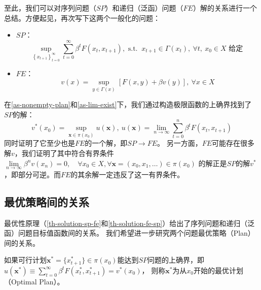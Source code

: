 至此，我们可以对序列问题（$SP$）和递归（泛函）问题（$FE$）解的关系进行一个总结。方便起见，再次写下这两个一般化的问题：
\begin{itemize}
    \item $SP$：
    \begin{equation*}
        \sup _{\left\{x_{t+1}\right\}_{t=0}^{\infty}} \sum_{t=0}^{\infty} \beta^t F\left(x_t, x_{t+1}\right),
            \text { s.t. } ~x_{t+1} \in\Gamma\left(x_t\right), ~\forall t, ~x_0 \in X \text { 给定 }
    \end{equation*}
    \item $FE$：
    \begin{equation*}
        v(x)=\sup _{y \in \Gamma(x)}[F(x, y)+\beta v(y)], ~\forall x \in X
    \end{equation*}
\end{itemize}

在\cref{as-nonempty-plan}和\cref{as-lim-exist}下，我们通过构造极限函数的上确界找到了$SP$的解：
\begin{equation*}
    v^*\left(x_0\right)=\sup _{\boldsymbol{x}\in\pi\left(x_0\right)}u\left(\boldsymbol{x}\right), ~
        u\left(\boldsymbol{x}\right)=\lim_{n\rightarrow\infty}\sum_{t=0}^{n}\beta^t F\left(x_t,x_{t+1}\right)
\end{equation*}
同时证明了它至少也是$FE$的一个解，即$SP\rightarrow FE$。
另一方面，$FE$可能存在很多解$v$，我们证明了其中符合有界条件
$\lim\limits_{n\rightarrow \infty}\beta^n v\left(x_n\right)=0, \quad \forall x_0\in X, 
    \forall \boldsymbol{x}=\left(x_0,x_1,\dots\right)\in \pi\left(x_0\right)$
的解正是$SP$的解$v^*$，即部分可逆。而$FE$的其余解一定违反了这一有界条件。


\subsection{最优策略间的关系}

最优性原理（\cref{th-solution-sp-fe}和\cref{th-solution-fe-sp}）给出了序列问题和递归（泛函）问题目标值函数间的关系。
我们希望进一步研究两个问题最优策略（Plan）间的关系。

\begin{definition}
    如果可行计划$\boldsymbol{x}^* = \{x_{t+1}^*\} \in\pi\left(x_0\right)$能达到$SP$问题的上确界，即
    $u\left(\boldsymbol{x}^*\right) \equiv 
        \sum_{t=0}^{\infty}\beta^t F\left(x_t^*,x_{t+1}^*\right) = v^*\left(x_0\right)$，
    则称$\boldsymbol{x}^*$为从$x_0$开始的最优计划（Optimal Plan）。
\end{definition}

